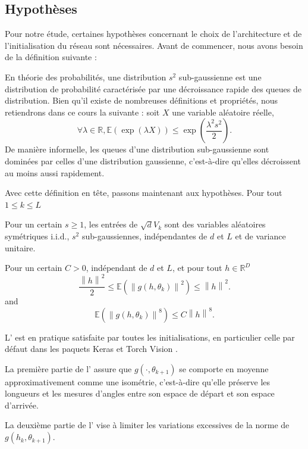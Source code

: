 \subsection*{Hypothèses}
Pour notre étude, certaines hypothèses concernant le choix de l'architecture et de l'initialisation du réseau sont nécessaires. Avant de commencer, nous avons besoin de la définition suivante :
\begin{definition}
    En théorie des probabilités, une distribution $s^2$ sub-gaussienne est une distribution de probabilité caractérisée par une décroissance rapide des queues de distribution. Bien qu'il existe de nombreuses définitions et propriétés, nous retiendrons dans ce cours la suivante : soit $X$ une variable aléatoire réelle,
    \[
        \forall \lambda \in \mathbb{R}, \mathbb{E}(\exp(\lambda X)) \leqslant \exp\left(\frac{\lambda^2 s^2}{2}\right).
    \]
    De manière informelle, les queues d'une distribution sub-gaussienne sont dominées par celles d'une distribution gaussienne, c'est-à-dire qu'elles décroissent au moins aussi rapidement.
\end{definition}

Avec cette définition en tête, passons maintenant aux hypothèses. Pour tout $ 1 \leqslant  k \leqslant L  $
\begin{assumption}\label{H1}
    Pour un certain $ s \geqslant 1 $, les entrées de  $ \sqrt{d}V_k $ sont des variables aléatoires symétriques i.i.d., $ s^2 $ sub-gaussiennes, indépendantes de $ d $ et $ L $ et de variance unitaire.
\end{assumption}
    
\begin{assumption}\label{H2}
    Pour un certain $ C > 0 $, indépendant de $ d $ et $ L $, et pour tout $ h \in \mathbb{R}^D  $ 
    \[
        \frac{\left\| h \right\| ^2}{2 } \leqslant  \mathbb{E}( \left\|  g(h, \theta _ k ) \right\| ^2 ) \leqslant \left\| h \right\| ^2
    .\]
    and
    \[
        \mathbb{E } (\left\| g(h, \theta _k)  \right\| ^8 ) \leqslant C \left\| h  \right\| ^8
    .\]
\end{assumption}

\begin{note}
    L' est en pratique satisfaite par toutes les initialisations, en particulier celle par défaut dans les paquets Keras \citep{chollet2015keras} et Torch Vision \citep{torchvision2016}.

    La première partie de l' assure que $g(\cdot, \theta_{k+1})$ se comporte en moyenne approximativement comme une isométrie, c'est-à-dire qu'elle préserve les longueurs et les mesures d'angles entre son espace de départ et son espace d'arrivée.

    La deuxième partie de l' vise à limiter les variations excessives de la norme de $g(h_k, \theta_{k+1})$.
\end{note}

